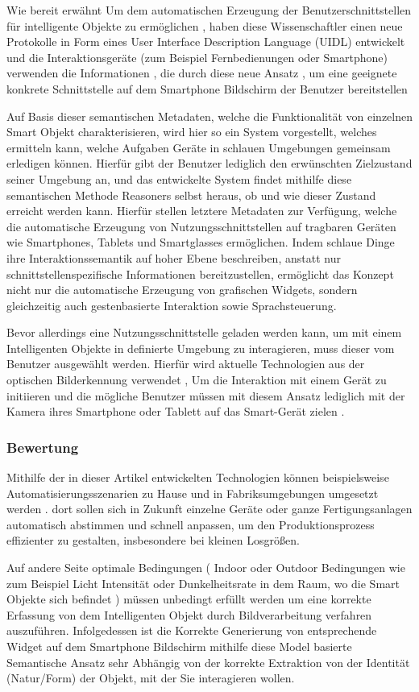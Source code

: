 Wie bereit erwähnt Um dem automatischen Erzeugung der Benutzerschnittstellen für intelligente Objekte zu ermöglichen , haben  diese Wissenschaftler einen neue  Protokolle in Form eines User Interface Description Language (UIDL) entwickelt  und die Interaktionsgeräte (zum Beispiel Fernbedienungen oder Smartphone) verwenden die Informationen , die durch diese neue Ansatz , um eine geeignete konkrete Schnittstelle auf dem Smartphone Bildschirm der  Benutzer bereitstellen

Auf Basis dieser semantischen Metadaten, welche die Funktionalität von einzelnen Smart Objekt  charakterisieren, wird hier  so ein System vorgestellt, welches ermitteln kann, welche Aufgaben Geräte in schlauen Umgebungen gemeinsam erledigen können. Hierfür gibt der Benutzer lediglich den erwünschten Zielzustand seiner Umgebung an, und das entwickelte  System findet mithilfe diese semantischen Methode Reasoners selbst heraus, ob und wie dieser Zustand erreicht werden kann.
Hierfür stellen letztere Metadaten zur Verfügung, welche die automatische Erzeugung von Nutzungsschnittstellen auf tragbaren Geräten wie Smartphones, Tablets und Smartglasses ermöglichen. Indem schlaue Dinge ihre Interaktionssemantik auf hoher Ebene beschreiben, anstatt nur schnittstellenspezifische Informationen bereitzustellen, ermöglicht das Konzept nicht nur die automatische Erzeugung von grafischen Widgets, sondern gleichzeitig auch gestenbasierte Interaktion sowie Sprachsteuerung. 

Bevor allerdings eine Nutzungsschnittstelle geladen werden kann, um mit einem Intelligenten Objekte in definierte Umgebung  zu interagieren, muss dieser vom Benutzer ausgewählt werden. 
Hierfür wird   aktuelle Technologien aus der optischen Bilderkennung verwendet , Um die Interaktion mit einem Gerät zu initiieren und die mögliche Benutzer  müssen mit diesem Ansatz lediglich mit der Kamera ihres Smartphone oder Tablett auf das Smart-Gerät zielen .


\subsubsection{Bewertung}
Mithilfe der in dieser Artikel entwickelten Technologien können beispielsweise Automatisierungsszenarien zu Hause und in Fabriksumgebungen umgesetzt werden .
dort sollen sich in Zukunft einzelne Geräte oder ganze Fertigungsanlagen automatisch abstimmen und schnell anpassen, um den Produktionsprozess effizienter zu gestalten, insbesondere bei kleinen Losgrößen.

Auf andere Seite optimale Bedingungen ( Indoor oder Outdoor Bedingungen wie zum Beispiel Licht Intensität oder Dunkelheitsrate in dem Raum, wo die Smart Objekte sich befindet  ) müssen unbedingt erfüllt werden um eine korrekte Erfassung von dem Intelligenten Objekt durch Bildverarbeitung verfahren auszuführen. Infolgedessen ist die Korrekte Generierung von  entsprechende Widget auf dem Smartphone  Bildschirm  mithilfe  diese Model basierte Semantische Ansatz  sehr Abhängig  von der korrekte Extraktion von der  Identität (Natur/Form) der Objekt,  mit der Sie interagieren wollen.


